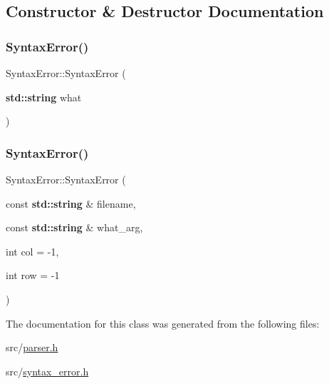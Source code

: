 \subsection{Constructor \& Destructor Documentation}
\mbox{\label{class_syntax_error_a9da44f87a053ae6c01a0504a67d6dd9b}} 
\subsubsection{\texorpdfstring{Syntax\+Error()}{SyntaxError()}\hspace{0.1cm}{\footnotesize\ttfamily [1/2]}}
{\footnotesize\ttfamily Syntax\+Error\+::\+Syntax\+Error (\begin{DoxyParamCaption}\item[{\textbf{ std\+::string}}]{what }\end{DoxyParamCaption})\hspace{0.3cm}{\ttfamily [inline]}}

\mbox{\label{class_syntax_error_a16dc968369bcbe16544f01e53dfd97d0}} 
\subsubsection{\texorpdfstring{Syntax\+Error()}{SyntaxError()}\hspace{0.1cm}{\footnotesize\ttfamily [2/2]}}
{\footnotesize\ttfamily Syntax\+Error\+::\+Syntax\+Error (\begin{DoxyParamCaption}\item[{const \textbf{ std\+::string} \&}]{filename,  }\item[{const \textbf{ std\+::string} \&}]{what\+\_\+arg,  }\item[{int}]{col = {\ttfamily -\/1},  }\item[{int}]{row = {\ttfamily -\/1} }\end{DoxyParamCaption})\hspace{0.3cm}{\ttfamily [inline]}}



The documentation for this class was generated from the following files\+:\begin{DoxyCompactItemize}
\item 
src/\hyperlink{parser_8h}{parser.\+h}\item 
src/\hyperlink{syntax__error_8h}{syntax\+\_\+error.\+h}\end{DoxyCompactItemize}
